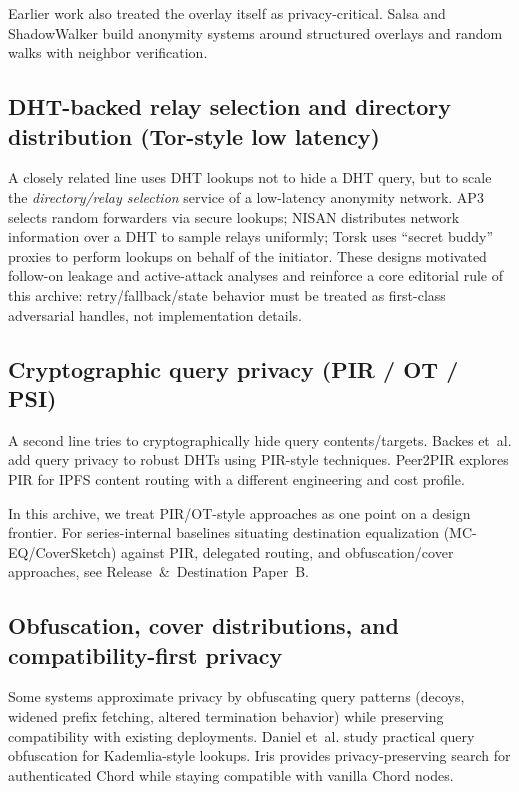 \documentclass[11pt]{article}
\begin{document}
Earlier work also treated the overlay itself as privacy-critical.
Salsa and ShadowWalker build anonymity systems around structured overlays and random walks with neighbor verification.\cite{salsa,shadowwalker}

\subsection{DHT-backed relay selection and directory distribution (Tor-style low latency)}
A closely related line uses DHT lookups not to hide a DHT query, but to scale the \emph{directory/relay selection} service of a low-latency anonymity network.
AP3 selects random forwarders via secure lookups; NISAN distributes network information over a DHT to sample relays uniformly; Torsk uses ``secret buddy'' proxies to perform lookups on behalf of the initiator.\cite{ap3,nisan,torsk}
These designs motivated follow-on leakage and active-attack analyses and reinforce a core editorial rule of this archive: retry/fallback/state behavior must be treated as first-class adversarial handles, not implementation details.\cite{wangborisovLookupCCS2010,mittal_tissec,tran2009failure}

\subsection{Cryptographic query privacy (PIR / OT / PSI)}
A second line tries to cryptographically hide query contents/targets.
Backes et~al. add query privacy to robust DHTs using PIR-style techniques.\cite{backesQueryPrivacy2012}
Peer2PIR explores PIR for IPFS content routing with a different engineering and cost profile.\cite{peer2pir2024}

In this archive, we treat PIR/OT-style approaches as one point on a design frontier.
For series-internal baselines situating destination equalization (MC-EQ/CoverSketch) against PIR, delegated routing, and obfuscation/cover approaches, see Release~\&~Destination Paper~B.\cite{series:mceq}

\subsection{Obfuscation, cover distributions, and compatibility-first privacy}
Some systems approximate privacy by obfuscating query patterns (decoys, widened prefix fetching, altered termination behavior) while preserving compatibility with existing deployments.
Daniel et~al. study practical query obfuscation for Kademlia-style lookups.\cite{danielQueryObfuscationSAC2025}
Iris provides privacy-preserving search for authenticated Chord while staying compatible with vanilla Chord nodes.\cite{irisNDSS2025}
\end{document}
